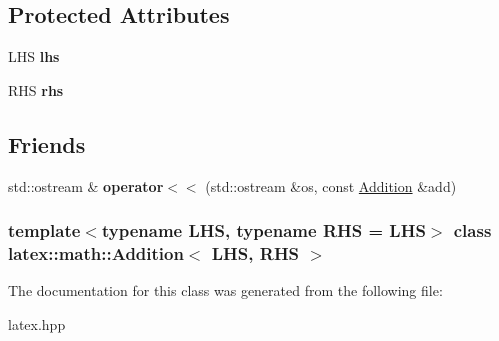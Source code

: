 \subsection*{\-Protected \-Attributes}
\begin{DoxyCompactItemize}
\item 
\hypertarget{classlatex_1_1math_1_1Addition_ac8d2192970f9214c489f803756453bf0}{\-L\-H\-S {\bfseries lhs}}\label{classlatex_1_1math_1_1Addition_ac8d2192970f9214c489f803756453bf0}

\item 
\hypertarget{classlatex_1_1math_1_1Addition_aa5abec9e5629652699b7e34887ec94a6}{\-R\-H\-S {\bfseries rhs}}\label{classlatex_1_1math_1_1Addition_aa5abec9e5629652699b7e34887ec94a6}

\end{DoxyCompactItemize}
\subsection*{\-Friends}
\begin{DoxyCompactItemize}
\item 
\hypertarget{classlatex_1_1math_1_1Addition_a4d362127264a2ef4b53edb9c7a983b18}{std\-::ostream \& {\bfseries operator$<$$<$} (std\-::ostream \&os, const \hyperlink{classlatex_1_1math_1_1Addition}{\-Addition} \&add)}\label{classlatex_1_1math_1_1Addition_a4d362127264a2ef4b53edb9c7a983b18}

\end{DoxyCompactItemize}
\subsubsection*{template$<$typename \-L\-H\-S, typename \-R\-H\-S = \-L\-H\-S$>$ class latex\-::math\-::\-Addition$<$ L\-H\-S, R\-H\-S $>$}



\-The documentation for this class was generated from the following file\-:\begin{DoxyCompactItemize}
\item 
latex.\-hpp\end{DoxyCompactItemize}
